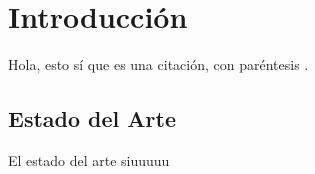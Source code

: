 \chapter{Introducción}\label{chapter:introduction}

Hola, esto sí que es una citación, con paréntesis \citep{MS15} \citep{MS15}.

\section{Estado del Arte}\label{chapter:state-of-the-art}
El estado del arte siuuuuu